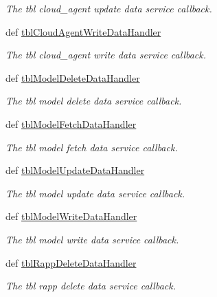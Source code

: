 \begin{DoxyCompactItemize}
\begin{DoxyCompactList}\small\item\em The tbl cloud\-\_\-agent update data service callback. \end{DoxyCompactList}\item 
def \hyperlink{classmysql__wrapper__old_1_1MySQLdbWrapper_a315f4b3f74c5175639bd0e9af6d2a90a}{tbl\-Cloud\-Agent\-Write\-Data\-Handler}
\begin{DoxyCompactList}\small\item\em The tbl cloud\-\_\-agent write data service callback. \end{DoxyCompactList}\item 
def \hyperlink{classmysql__wrapper__old_1_1MySQLdbWrapper_af54dc9c984cff703b2a6285824c1884f}{tbl\-Model\-Delete\-Data\-Handler}
\begin{DoxyCompactList}\small\item\em The tbl model delete data service callback. \end{DoxyCompactList}\item 
def \hyperlink{classmysql__wrapper__old_1_1MySQLdbWrapper_a541d80f7c7578b597a5e660460c596b7}{tbl\-Model\-Fetch\-Data\-Handler}
\begin{DoxyCompactList}\small\item\em The tbl model fetch data service callback. \end{DoxyCompactList}\item 
def \hyperlink{classmysql__wrapper__old_1_1MySQLdbWrapper_a43076416e6b5a35ab159944f5bbfc06e}{tbl\-Model\-Update\-Data\-Handler}
\begin{DoxyCompactList}\small\item\em The tbl model update data service callback. \end{DoxyCompactList}\item 
def \hyperlink{classmysql__wrapper__old_1_1MySQLdbWrapper_ab0666868dc36535c10d01f2d6e59a429}{tbl\-Model\-Write\-Data\-Handler}
\begin{DoxyCompactList}\small\item\em The tbl model write data service callback. \end{DoxyCompactList}\item 
def \hyperlink{classmysql__wrapper__old_1_1MySQLdbWrapper_a95bc72f92d7bff28d2e1d6ecf2abd4d6}{tbl\-Rapp\-Delete\-Data\-Handler}
\begin{DoxyCompactList}\small\item\em The tbl rapp delete data service callback. \end{DoxyCompactList}\item 

\end{DoxyCompactItemize}
